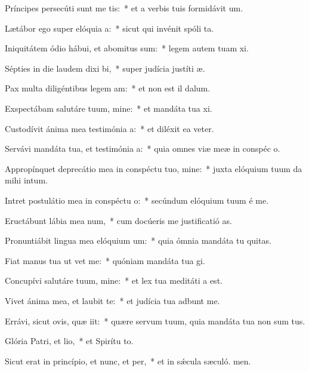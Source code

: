 \item Príncipes persecúti sunt me tis:~* et a verbis tuis formidávit  um.
\item Lætábor ego super elóquia a:~* sicut qui invénit spóli ta.
\item Iniquitátem ódio hábui, et abomitus sum:~* legem autem tuam xi.
\item Sépties in die laudem dixi bi,~* super judícia justíti æ.
\item Pax multa diligéntibus legem am:~* et non est il dalum.
\item Exspectábam salutáre tuum, mine:~* et mandáta tua xi.
\item Custodívit ánima mea testimónia a:~* et diléxit ea veter.
\item Servávi mandáta tua, et testimónia a:~* quia omnes viæ meæ in conspéc o.
\item Appropínquet deprecátio mea in conspéctu tuo, mine:~* juxta elóquium tuum da mihi intum.
\item Intret postulátio mea in conspéctu o:~* secúndum elóquium tuum é me.
\item Eructábunt lábia mea num,~* cum docúeris me justificatió as.
\item Pronuntiábit lingua mea elóquium um:~* quia ómnia mandáta tu quitas.
\item Fiat manus tua ut vet me:~* quóniam mandáta tua gi.
\item Concupívi salutáre tuum, mine:~* et lex tua meditáti a est.
\item Vivet ánima mea, et laubit te:~* et judícia tua adbunt me.
\item Errávi, sicut ovis, quæ iit:~* quære servum tuum, quia mandáta tua non sum tus.
\item Glória Patri, et lio,~* et Spirítu to.
\item Sicut erat in princípio, et nunc, et per,~* et in sǽcula sæculó. men.
